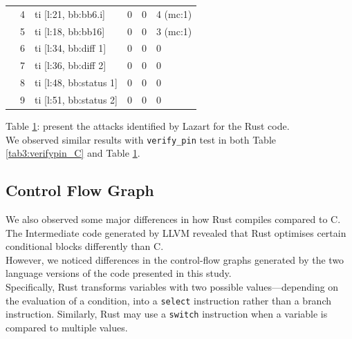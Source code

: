 \begin{table}[H]
{\begin{tabular}{l|l|l|l|l|l}
                    & 4  & ti [l:21, bb:bb6.i]                        & 0       & 0        & 4 (mc:1)   \\
                    & 5  & ti [l:18, bb:bb16]                         & 0       & 0        & 3 (mc:1)   \\
                    & 6  & ti [l:34, bb:diff 1]                       & 0       & 0        & 0          \\
                    & 7  & ti [l:36, bb:diff 2]                       & 0       & 0        & 0          \\
                    & 8  & ti [l:48, bb:status 1]                     & 0       & 0        & 0          \\
                    & 9  & ti [l:51, bb:status 2]                     & 0       & 0        & 0          \\
            \bottomrule
        \end{tabular}
    }
    \label{tab4:verifypin_Rust}
\end{table}
\noindent Table \ref{tab4:verifypin_Rust}: present the attacks identified by Lazart for the Rust code.\\

We observed similar results with \texttt{verify\_pin} test in both Table \ref{tab3:verifypin_C} and Table \ref{tab4:verifypin_Rust}.


       
\subsection{Control Flow Graph}
\label{subsection:result cfg}
We also observed some major differences in how Rust compiles compared to C.\\
The Intermediate code generated by LLVM revealed that Rust optimises certain conditional blocks differently than C.\\

However, we noticed differences in the control-flow graphs generated by the two language versions of the code presented in this study.\\
Specifically, Rust transforms variables with two possible values—depending on the evaluation of a condition, into a \texttt{select} instruction rather than a branch instruction.
Similarly, Rust may use a \texttt{switch} instruction when a variable is compared to multiple values.